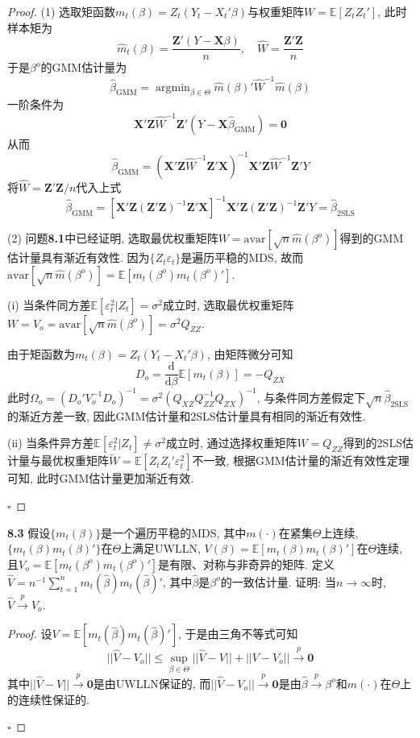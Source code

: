 \documentclass[cn,12pt,math=mtpro2,citestyle=gb7714-2015,bibstyle=gb7714-2015,twocol,mode=simple]{elegantbook}
\newcommand{\E}{\mathbb{E}}
\newcommand{\hbeta}{\hat{\beta}}
\newcommand{\btls}{\hat{\beta}_{\text{2SLS}}}
\newcommand{\hatm}{\hat{m}}
\newcommand{\dd}{\text{d}}
\begin{document}
  \begin{proof}
    (1) 选取矩函数$m_t(\beta)=Z_t(Y_t-X_t'\beta)$与权重矩阵$W=\E[Z_tZ_t']$, 此时样本矩为
    $$\displaystyle\hat{m}_t(\beta)=\frac{\mathbf{Z}'(Y-\mathbf{X}\beta)}{n},\quad \hat{W}=\displaystyle\frac{\mathbf{Z}'\mathbf{Z}}{n}$$
    于是$\beta^o$的GMM估计量为
    $$\hat{\beta}_{\text{GMM}}=\mathop{\arg\min}_{\beta\in\Theta}\hat{m}(\beta)'\hat{W}^{-1}\hat{m}(\beta)$$
    一阶条件为
    $$\mathbf{X}'\mathbf{Z}\hat{W}^{-1}\mathbf{Z}'(Y-\mathbf{X}\hbeta_{\text{GMM}})=\mathbf{0}$$
    从而
    $$\hbeta_{\text{GMM}}=(\mathbf{X}'\mathbf{Z}\hat{W}^{-1}\mathbf{Z}'\mathbf{X})^{-1}\mathbf{X}'\mathbf{Z}\hat{W}^{-1}\mathbf{Z}'Y$$
    将$\hat{W}=\mathbf{Z}'\mathbf{Z}/n$代入上式
    $$\hat{\beta}_{\text{GMM}}=[\mathbf{X}'\mathbf{Z}(\mathbf{Z}'\mathbf{Z})^{-1}\mathbf{Z}'\mathbf{X}]^{-1}\mathbf{X}'\mathbf{Z}(\mathbf{Z}'\mathbf{Z})^{-1}\mathbf{Z}'Y=\btls$$

    (2) 问题\textbf{8.1}中已经证明, 选取最优权重矩阵$W=\text{avar}[\sqrt{n}\hatm(\beta^o)]$得到的GMM估计量具有渐近有效性. 因为$\{Z_t\varepsilon_t\}$是遍历平稳的MDS, 故而$\text{avar}[\sqrt{n}\hatm(\beta^o)]=\E[m_t(\beta^o)m_t(\beta^o)']$.

    (i) 当条件同方差$\E[\varepsilon_t^2|Z_t]=\sigma^2$成立时, 选取最优权重矩阵$W=V_o=\text{avar}[\sqrt{n}\hatm(\beta^o)]=\sigma^2Q_{ZZ}$.

    由于矩函数为$m_t(\beta)=Z_t(Y_t-X_t'\beta)$, 由矩阵微分可知
    $$D_o=\frac{\text{d}}{\dd\beta}\E[m_t(\beta)]=-Q_{ZX}$$
    此时$\Omega_o=(D_o'V_o^{-1}D_o)^{-1}=\sigma^2(Q_{XZ}Q_{ZZ}^{-1}Q_{ZX})^{-1}$, 与条件同方差假定下$\sqrt{n}\btls$的渐近方差一致, 因此GMM估计量和2SLS估计量具有相同的渐近有效性.

    (ii) 当条件异方差$\E[\varepsilon_t^2|Z_t]\neq\sigma^2$成立时, 通过选择权重矩阵$W=Q_{ZZ}$得到的2SLS估计量与最优权重矩阵$\tilde{W}=\E[Z_tZ_t'\varepsilon_t^2]$不一致, 根据GMM估计量的渐近有效性定理可知, 此时GMM估计量更加渐近有效.

    $\square$
  \end{proof}

  \textbf{8.3} 假设$\{m_t(\beta)\}$是一个遍历平稳的MDS, 其中$m(\cdot)$在紧集$\Theta$上连续, $\{m_t(\beta)m_t(\beta)'\}$在$\Theta$上满足UWLLN, $V(\beta)=\E[m_t(\beta)m_t(\beta)']$在$\Theta$连续, 且$V_o=\E[m_t(\beta^o)m_t(\beta^o)']$是有限、对称与非奇异的矩阵. 定义$\displaystyle\hat{V}=n^{-1}\sum_{t=1}^{n}m_t(\hbeta)m_t(\hbeta)'$, 其中$\hbeta$是$\beta^o$的一致估计量. 证明: 当$n\to\infty$时, $\hat{V}\xrightarrow{p}V_o$.

  \begin{proof}
    设$V=\E[m_t(\hat{\beta})m_t(\hbeta)']$, 于是由三角不等式可知
    $$||\hat{V}-V_o ||\leq \sup_{\beta\in\Theta}|| \hat{V}-V ||+|| V-V_o ||\xrightarrow{p}\mathbf{0}$$
    其中$||\hat{V}-V||\xrightarrow{p}\mathbf{0}$是由UWLLN保证的, 而$||\hat{V}-V_o||\xrightarrow{p}\mathbf{0}$是由$\hat{\beta}\xrightarrow{p}\beta^o$和$m(\cdot)$在$\Theta$上的连续性保证的.

    $\square$
  \end{proof}
\end{document}
